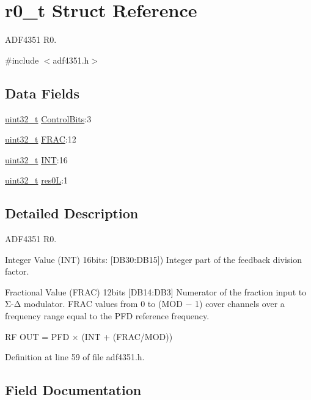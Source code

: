 \hypertarget{structr0__t}{}\section{r0\+\_\+t Struct Reference}
\label{structr0__t}


A\+D\+F4351 R0.  




{\ttfamily \#include $<$adf4351.\+h$>$}

\subsection*{Data Fields}
\begin{DoxyCompactItemize}
\item 
\hyperlink{send_8c_a435d1572bf3f880d55459d9805097f62}{uint32\+\_\+t} \hyperlink{structr0__t_aad2911768ed7dd38e899b81d517dda08}{Control\+Bits}\+:3
\item 
\hyperlink{send_8c_a435d1572bf3f880d55459d9805097f62}{uint32\+\_\+t} \hyperlink{structr0__t_adc22c0b86ef296065f01c8800d4f5d52}{F\+R\+AC}\+:12
\item 
\hyperlink{send_8c_a435d1572bf3f880d55459d9805097f62}{uint32\+\_\+t} \hyperlink{structr0__t_a1d7f06769cdf259c9858033cb164e31d}{I\+NT}\+:16
\item 
\hyperlink{send_8c_a435d1572bf3f880d55459d9805097f62}{uint32\+\_\+t} \hyperlink{structr0__t_ab7402e75c2a633ce378078407151341d}{res0L}\+:1
\end{DoxyCompactItemize}


\subsection{Detailed Description}
A\+D\+F4351 R0. 

Integer Value (I\+NT) 16bits\+: \mbox{[}D\+B30\+:D\+B15\mbox{]}) Integer part of the feedback division factor.

Fractional Value (F\+R\+AC) 12bits \mbox{[}D\+B14\+:D\+B3\mbox{]} Numerator of the fraction input to Σ-\/Δ modulator. F\+R\+AC values from 0 to (M\+OD − 1) cover channels over a frequency range equal to the P\+FD reference frequency.

RF O\+UT = P\+FD × (I\+NT + (F\+R\+A\+C/\+M\+OD)) 

Definition at line 59 of file adf4351.\+h.



\subsection{Field Documentation}
